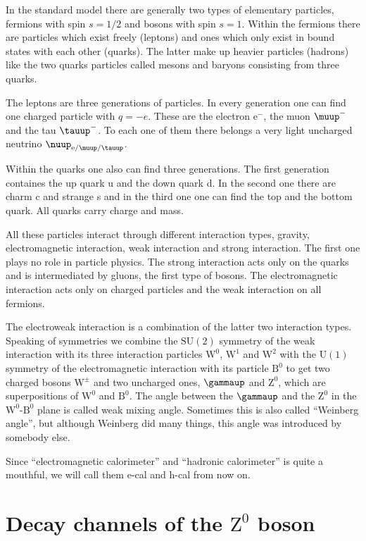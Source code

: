 \documentclass[11pt, english, fleqn, DIV=15, headinclude, BCOR=2cm]{scrreprt}
\newcommand\ecal{e-cal}
\newcommand\hcal{h-cal}
\begin{document}
In the standard model there are generally two types of elementary particles,
fermions with spin $s = 1/2$ and bosons with spin $s = 1$. Within the fermions
there are particles which exist freely (leptons) and ones which only exist in
bound states with each other (quarks). The latter make up heavier particles
(hadrons) like the two quarks particles called mesons and baryons consisting
from three quarks. 

The leptons are three generations of particles. In every
generation one can find one charged particle with $q = -e$. These are the
electron $\mathrm e^-$, the muon $\muup^-$ and the tau $\tauup^-$. To each
one of them there belongs a very light uncharged neutrino
$\nuup_{\mathrm{e}/\muup/\tauup}$.

Within the quarks one also can find three generations. The first generation
containes the up quark u and the down quark d. In the second one there are
charm c and strange s and in the third one one can find the top and the bottom
quark. All quarks carry charge and mass.

All these particles interact through different interaction types, gravity,
electromagnetic interaction, weak interaction and strong interaction. The first
one plays no role in particle physics. The strong interaction acts only on the
quarks and is intermediated by gluons, the first type of bosons. The
electromagnetic interaction acts only on charged particles and the weak
interaction on all fermions. 

The electroweak interaction is a combination of the latter two interaction
types. Speaking of symmetries we combine the $\mathrm{SU}(2)$ symmetry of the
weak interaction with its three interaction particles $\mathrm W^0$, $\mathrm
W^1$ and $\mathrm W^2$ with the $\mathrm U(1)$ symmetry of the electromagnetic
interaction with its particle $\mathrm B^0$ to get two charged bosons $\mathrm
W^\pm$ and two uncharged ones, $\gammaup$ and $\mathrm Z^0$, which are
superpositions of $\mathrm W^0$ and $\mathrm B^0$. The angle between the
$\gammaup$ and the $\mathrm Z^0$ in the $\mathrm W^0$-$\mathrm B^0$ plane is
called weak mixing angle. Sometimes this is also called \enquote{Weinberg
angle}, but although Weinberg did many things, this angle was introduced by
somebody else.

Since \enquote{electromagnetic calorimeter} and \enquote{hadronic calorimeter}
is quite a mouthful, we will call them \ecal{} and \hcal{} from now on.

\section{Decay channels of the $\mathrm Z^0$ boson}
\end{document}
